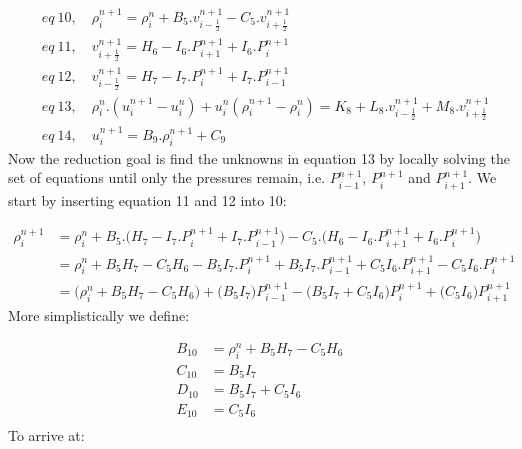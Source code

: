 \documentclass[11pt,letterpaper,titlepage]{article}
\newcommand{\half}{\frac{1}{2}}
\begin{document}
\begin{equation*}
\begin{aligned}
&eq \ 10, \quad \rho_i^{n+1}=\rho_i^{n}+B_5.v_{i-\half}^{n+1} - C_5.v_{i+\half}^{n+1}\\
&eq \ 11, \quad v_{i+\half}^{n+1}=H_6-I_6.P_{i+1}^{n+1}+I_6.P_{i}^{n+1} \\
&eq \ 12, \quad v_{i-\half}^{n+1}=H_7-I_7.P_{i}^{n+1}+I_7.P_{i-1}^{n+1} \\
&eq \ 13, \quad \rho_i^{n}.(u_i^{n+1}-u_i^{n}) + u_i^{n}(\rho_i^{n+1}-\rho_i^{n})=K_8+L_8.v_{i-\half}^{n+1}+M_8.v_{i+\half}^{n+1} \\
&eq \ 14, \quad u_{i}^{n+1} = B_9.\rho_{i}^{n+1}+C_9
\end{aligned}
\end{equation*}
\newline
Now the reduction goal is find the unknowns in equation 13 by locally solving the set of equations until only the pressures remain, i.e. $P_{i-1}^{n+1}$, $P_{i}^{n+1}$ and $P_{i+1}^{n+1}$.
\newline
\newline
We start by inserting equation 11 and 12 into 10:

\begin{equation*}
\begin{aligned}
\rho_i^{n+1}&=\rho_i^{n}+B_5.\biggr( H_7-I_7.P_{i}^{n+1}+I_7.P_{i-1}^{n+1} \biggr)- C_5.\biggr(H_6-I_6.P_{i+1}^{n+1}+I_6.P_{i}^{n+1} \biggr) \\
&=\rho_i^n + B_5 H_7 - C_5 H_6 - B_5 I_7 . P_{i}^{n+1} + B_5 I_7 . P_{i-1}^{n+1} + C_5 I_6.P_{i+1}^{n+1} - C_5 I_6.P_{i}^{n+1} \\
&=\biggr( \rho_i^n + B_5 H_7 - C_5 H_6  \biggr) + \biggr( B_5 I_7 \biggr) P_{i-1}^{n+1} - \biggr(B_5 I_7 + C_5 I_6    \biggr) P_{i}^{n+1}+ \biggr(  C_5 I_6  \biggr) P_{i+1}^{n+1}
\end{aligned}
\end{equation*}
\newline
More simplistically we define:

\begin{equation*}
\begin{aligned}
B_{10} &=  \rho_i^n + B_5 H_7 - C_5 H_6 \\
C_{10} &=   B_5 I_7 \\
D_{10} &=  B_5 I_7 + C_5 I_6  \\
E_{10} &=  C_5 I_6 \\
\end{aligned}
\end{equation*}
\newline
To arrive at:
\end{document}
